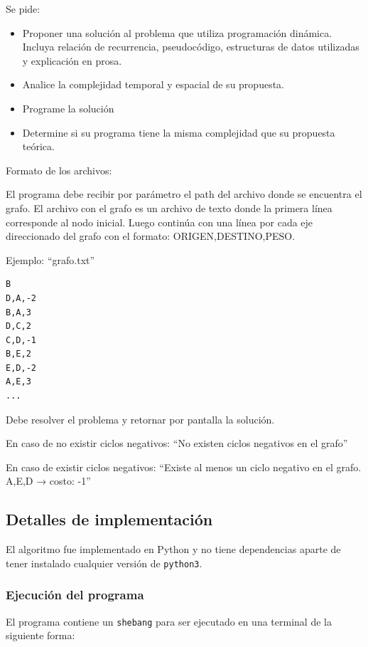 \documentclass[titlepage,a4paper]{article}
\begin{document}
Se pide:

\begin{itemize}
\item Proponer una solución al problema que utiliza programación dinámica. Incluya relación de recurrencia, pseudocódigo, estructuras de datos utilizadas y explicación en prosa.

\item Analice la complejidad temporal y espacial de su propuesta.

\item Programe la solución

\item Determine si su programa tiene la misma complejidad que su propuesta teórica.
\end{itemize}

Formato de los archivos:

El programa debe recibir por parámetro el path del archivo donde se encuentra el grafo. El archivo con el grafo es un archivo de texto donde la primera línea corresponde al nodo inicial. Luego continúa con una línea por cada eje direccionado del grafo con el formato: ORIGEN,DESTINO,PESO.

Ejemplo: “grafo.txt”

\begin{verbatim}
B
D,A,-2
B,A,3
D,C,2
C,D,-1
B,E,2
E,D,-2
A,E,3
...
\end{verbatim}

Debe resolver el problema y retornar por pantalla la solución.

En caso de no existir ciclos negativos: “No existen ciclos negativos en el grafo”

En caso de existir ciclos negativos: “Existe al menos un ciclo negativo en el grafo. A,E,D → costo: -1”


\subsection{Detalles de implementación}
\label{sec:orga679c3b}

El algoritmo fue implementado en Python y no tiene dependencias aparte de tener
instalado cualquier versión de \texttt{python3}.

\subsubsection{Ejecución del programa}
\label{sec:org75f3cdd}

El programa contiene un \texttt{shebang} para ser ejecutado en una terminal de la
siguiente forma:
\end{document}

